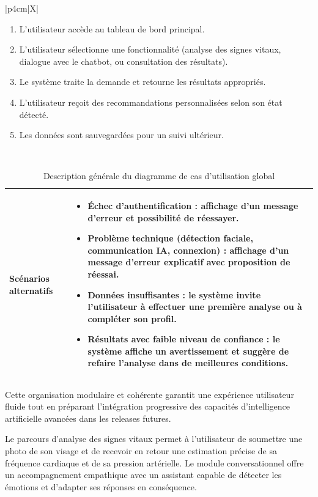 \begin{table}[H]
\begin{tabularx}{\linewidth}{|p{4cm}|X|}
\begin{enumerate}
    \item L'utilisateur accède au tableau de bord principal.
    \item L'utilisateur sélectionne une fonctionnalité (analyse des signes vitaux, dialogue avec le chatbot, ou consultation des résultats).
    \item Le système traite la demande et retourne les résultats appropriés.
    \item L'utilisateur reçoit des recommandations personnalisées selon son état détecté.
    \item Les données sont sauvegardées pour un suivi ultérieur.
\end{enumerate} \\
\hline
\end{tabularx}
\end{table}

\begin{table}[H]
\centering
\small
\begin{tabularx}{\linewidth}{|p{4cm}|X|}
\hline
\textbf{Scénarios alternatifs} & 
\begin{itemize}
    \item Échec d'authentification : affichage d'un message d'erreur et possibilité de réessayer.
    \item Problème technique (détection faciale, communication IA, connexion) : affichage d'un message d'erreur explicatif avec proposition de réessai.
    \item Données insuffisantes : le système invite l'utilisateur à effectuer une première analyse ou à compléter son profil.
    \item Résultats avec faible niveau de confiance : le système affiche un avertissement et suggère de refaire l'analyse dans de meilleures conditions.
\end{itemize} \\
\hline
\end{tabularx}
\caption{Description générale du diagramme de cas d'utilisation global}
\end{table}


Cette organisation modulaire et cohérente garantit une expérience utilisateur fluide tout en préparant l'intégration progressive des capacités d'intelligence artificielle avancées dans les releases futures.

Le parcours d'analyse des signes vitaux permet à l'utilisateur de soumettre une photo de son visage et de recevoir en retour une estimation précise de sa fréquence cardiaque et de sa pression artérielle. Le module conversationnel offre un accompagnement empathique avec un assistant capable de détecter les émotions et d'adapter ses réponses en conséquence.

